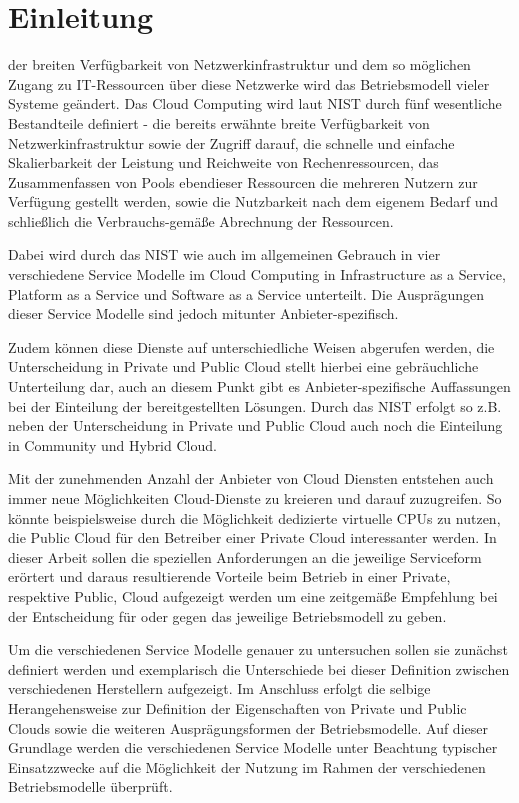 \section{Einleitung}
\label{sec_introduction}

 der breiten Verfügbarkeit von Netzwerkinfrastruktur und dem so möglichen Zugang zu IT-Ressourcen über diese Netzwerke wird das Betriebsmodell vieler Systeme geändert. Das Cloud Computing wird laut NIST durch fünf wesentliche Bestandteile definiert - die bereits erwähnte breite Verfügbarkeit von Netzwerkinfrastruktur sowie der Zugriff darauf, die schnelle und einfache Skalierbarkeit der Leistung und Reichweite von Rechenressourcen, das Zusammenfassen von Pools ebendieser Ressourcen die mehreren Nutzern zur Verfügung gestellt werden, sowie die Nutzbarkeit nach dem eigenem Bedarf und schließlich die Verbrauchs-gemäße Abrechnung der Ressourcen.

Dabei wird durch das NIST wie auch im allgemeinen Gebrauch in vier verschiedene Service Modelle im Cloud Computing in Infrastructure as a Service, Platform as a Service und Software as a Service unterteilt. Die Ausprägungen dieser Service Modelle sind jedoch mitunter Anbieter-spezifisch.

Zudem können diese Dienste auf unterschiedliche Weisen abgerufen werden, die Unterscheidung in Private und Public Cloud stellt hierbei eine gebräuchliche Unterteilung dar, auch an diesem Punkt gibt es Anbieter-spezifische Auffassungen bei der Einteilung der bereitgestellten Lösungen. Durch das NIST erfolgt so z.B. neben der Unterscheidung in Private und Public Cloud auch noch die Einteilung in Community und Hybrid Cloud.

Mit der zunehmenden Anzahl der Anbieter von Cloud Diensten entstehen auch immer neue Möglichkeiten Cloud-Dienste zu kreieren und darauf zuzugreifen. So könnte beispielsweise durch die Möglichkeit dedizierte virtuelle CPUs zu nutzen, die Public Cloud für den Betreiber einer Private Cloud interessanter werden. In dieser Arbeit sollen die speziellen Anforderungen an die jeweilige Serviceform erörtert und daraus resultierende Vorteile beim Betrieb in einer Private, respektive Public, Cloud aufgezeigt werden um eine zeitgemäße Empfehlung bei der Entscheidung für oder gegen das jeweilige Betriebsmodell zu geben. 

Um die verschiedenen Service Modelle genauer zu untersuchen sollen sie zunächst definiert werden und exemplarisch die Unterschiede bei dieser Definition zwischen verschiedenen Herstellern aufgezeigt. Im Anschluss erfolgt die selbige Herangehensweise zur Definition der Eigenschaften von Private und Public Clouds sowie die weiteren Ausprägungsformen der Betriebsmodelle. Auf dieser Grundlage werden die verschiedenen Service Modelle unter Beachtung typischer Einsatzzwecke auf die Möglichkeit der Nutzung im Rahmen der verschiedenen Betriebsmodelle überprüft.
